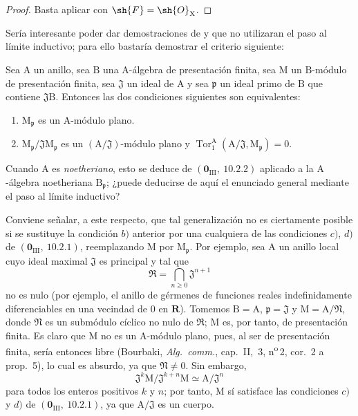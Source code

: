 \begin{proof}
Basta aplicar  con $\sh{F}=\sh{O}_\mathrm{X}$.
\end{proof}

\begin{remark}[11.3.12]
\label{IV.11.3.12}
Sería interesante poder dar demostraciones de  y  que no utilizaran el paso al límite inductivo; para ello bastaría demostrar el criterio siguiente:

Sea $\mathrm{A}$ un anillo, sea $\mathrm{B}$ una $\mathrm{A}$-álgebra de presentación finita, sea $\mathrm{M}$ un $\mathrm{B}$-módulo de presentación finita, sea $\mathfrak{J}$ un  ideal de $\mathrm{A}$ y sea $\mathfrak{p}$ un ideal primo de $\mathrm{B}$ que contiene $\mathfrak{J}\mathrm{B}$. Entonces las dos condiciones siguientes son equivalentes:
\begin{enumerate}[label=\emph{\alph*)}]
  \item $\mathrm{M}_\mathfrak{p}$ es un $\mathrm{A}$-módulo plano.
  \item $\mathrm{M}_\mathfrak{p}/\mathfrak{J}\mathrm{M}_\mathfrak{p}$ es un $(\mathrm{A}/\mathfrak{J})$-módulo plano y $\operatorname{Tor}_1^\mathrm{A}(\mathrm{A}/\mathfrak{J},\mathrm{M}_\mathfrak{p})=0$.
\end{enumerate}
Cuando $\mathrm{A}$ es \emph{noetheriano}, esto se deduce de $(\mathbf{0}_{\mathrm{III}},~10.2.2)$ aplicado a la $\mathrm{A}$-álgebra noetheriana $\mathrm{B}_\mathfrak{p}$; ¿puede deducirse de aquí el enunciado general mediante el paso al límite inductivo?

Conviene señalar, a este respecto, que tal generalización no es ciertamente posible si se sustituye la condición $b)$ anterior por una cualquiera de las condiciones $c)$, $d)$ de $(\mathbf{0}_{\mathrm{III}},~10.2.1)$, reemplazando $\mathrm{M}$ por $\mathrm{M}_\mathfrak{p}$. Por ejemplo, sea $\mathrm{A}$ un anillo local cuyo ideal maximal $\mathfrak{J}$ es principal y tal que
\[
  \mathfrak{R}=\bigcap_{n\geqslant 0}\mathfrak{J}^{n+1}
\]
no es nulo (por ejemplo, el anillo de gérmenes de funciones reales indefinidamente diferenciables en una vecindad de $0$ en $\mathbf{R}$). Tomemos $\mathrm{B}=\mathrm{A}$, $\mathfrak{p}=\mathfrak{J}$ y $\mathrm{M}=\mathrm{A}/\mathfrak{N}$, donde $\mathfrak{N}$ es un submódulo cíclico no nulo de $\mathfrak{R}$; $\mathrm{M}$ es, por tanto, de presentación finita. Es claro que $\mathrm{M}$ no es un $\mathrm{A}$-módulo plano, pues, al ser de presentación finita, sería entonces libre (Bourbaki, \emph{Alg.\ comm.}, cap.~II, \textsection\,3, n\textsuperscript{o}\,2, cor.~2 a prop.~5), lo cual es absurdo, ya que $\mathfrak{N}\neq 0$. Sin embargo,
\[
  \mathfrak{J}^k\mathrm{M}/\mathfrak{J}^{k+n}\mathrm{M}\simeq \mathrm{A}/\mathfrak{J}^n
\]
para todos los enteros positivos $k$ y $n$; por tanto, $\mathrm{M}$ sí satisface las condiciones $c)$ y $d)$ de $(\mathbf{0}_{\mathrm{III}},~10.2.1)$, ya que $\mathrm{A}/\mathfrak{J}$ es un cuerpo.
\end{remark}

